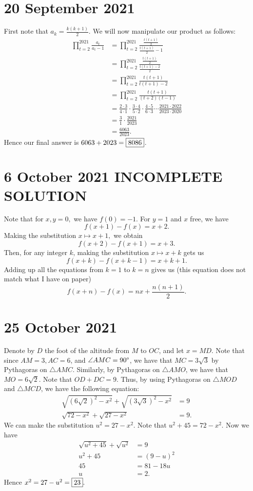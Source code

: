 \documentclass[letterpaper,oneside]{scrartcl}
\begin{document}
\section*{20 September 2021}
First note that \(a_k=\frac{k(k+1)}{2}\). We will now manipulate our product as follows:
\begin{align*}
    \prod_{t=2}^{2021} \frac{a_t}{a_t-1} &= \prod_{t=2}^{2021} \frac{\tfrac{t(t+1)}{2}}{\tfrac{t(t+1)}{2}-1}\\
    &= \prod_{t=2}^{2021} \frac{\tfrac{t(t+1)}{2}}{\tfrac{t(t+1)-2}{2}}\\
    &= \prod_{t=2}^{2021} \frac{t(t+1)}{t(t+1)-2}\\
    &= \prod_{t=2}^{2021} \frac{t(t+1)}{(t+2)(t-1)}\\
    &= \frac{2\cdot3}{4\cdot1}\cdot\frac{3\cdot4}{5\cdot2}\cdot\frac{4\cdot5}{6\cdot3}\cdots\frac{2021\cdot2022}{2023\cdot2020}\\
    &= \frac{3}{1}\cdot\frac{2021}{2023}\\
    &= \frac{6063}{2023}.
\end{align*}
Hence our final answer is \(6063+2023 = \fbox{8086}\).

\section*{6 October 2021 INCOMPLETE SOLUTION}
Note that for \(x,y=0,\) we have \(f(0) = -1\). For \(y=1\) and \(x\) free, we have
\[f(x+1)-f(x)=x+2.\]
Making the substitution \(x \mapsto x+1,\) we obtain 
\[f(x+2)-f(x+1)=x+3.\]
Then, for any integer \(k\), making the substitution \(x \mapsto x+k\) gets us
\[f(x+k)-f(x+k-1)=x+k+1.\]
Adding up all the equations from \(k=1\) to \(k=n\) gives us (this equation does not match what I have on paper)
\[f(x+n)-f(x)=nx+\frac{n(n+1)}{2}. \]

\section*{25 October 2021}
Denote by \(D\) the foot of the altitude from \(M\) to \(OC\), and let \(x = MD\). Note that since \(AM = 3, AC = 6\), and \(\angle AMC = 90\degree\), we have that \(MC = 3\sqrt3\) by Pythagoras on \(\triangle AMC\). Similarly, by Pythagoras on \(\triangle AMO\), we have that \(MO = 6\sqrt2\). Note that \(OD + DC = 9\). Thus, by using Pythagoras on \(\triangle MOD\) and \(\triangle MCD\), we have the following equation:
\begin{align*}
    \sqrt{(6\sqrt2)^2-x^2}+\sqrt{(3\sqrt3)^2-x^2} &= 9 \\
    \sqrt{72-x^2}+\sqrt{27-x^2} &= 9.
\end{align*}
We can make the substitution \(u^2=27-x^2\). Note that \(u^2+45=72-x^2\). Now we have
\begin{align*}
    \sqrt{u^2+45} + \sqrt{u^2} &= 9 \\
    u^2+45 &= (9-u)^2 \\
    45 &= 81-18u \\
    u &= 2.
\end{align*}
Hence \(x^2 = 27-u^2 = \fbox{23}.\)
\end{document}
